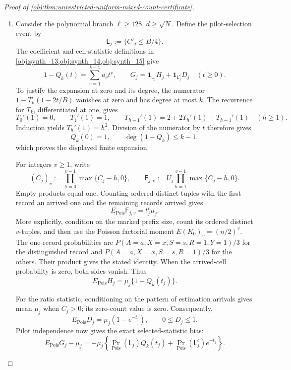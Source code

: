 \documentclass[11pt]{article}
\begin{document}
\begin{proof}[Proof of \cref{obj:thm:unrestricted-uniform-mixed-count-certificate}]
\begin{enumerate}
\item Consider the polynomial branch
\(\ell\ge128\), \(d\ge\sqrt N\). Define the pilot-selection event by
\[
\mathsf L_j:=\{C'_j\le B/4\}.
\]
The coefficient and cell-statistic definitions in
\cref{obj:synth_13,obj:synth_14,obj:synth_15} give
\[
1-Q_k(t)=\sum_{v=1}^{k-1}a_vt^v,
\qquad
G_j=\mathbf1_{\mathsf L_j}H_j+
\mathbf1_{\mathsf L_j^c}D_j
\quad(t\ge0).
\]
To justify the expansion at zero and its degree, the numerator
\(1-T_k(1-2t/B)\) vanishes at zero and has degree at most \(k\).
The recurrence for \(T_k\), differentiated at one, gives
\[
T_0'(1)=0,\qquad T_1'(1)=1,\qquad
T_{h+1}'(1)=2+2T_h'(1)-T_{h-1}'(1)
\quad(h\ge1).
\]
Induction yields \(T_h'(1)=h^2\). Division of the numerator by \(t\)
therefore gives
\[
Q_k(0)=1,\qquad \deg(1-Q_k)\le k-1,
\]
which proves the displayed finite expansion.

For integers \(v\ge1\), write
\[
(C_j)_v:=\prod_{h=0}^{v-1}\max\{C_j-h,0\},
\qquad
\mathsf F_{j,v}:=
U_j\prod_{h=1}^{v-1}\max\{C_j-h,0\}.
\]
Empty products equal one. Counting ordered distinct tuples with the first
record an arrived one and the remaining records arrived gives
\[
E_{\mathrm{Pois}}\mathsf F_{j,v}
=t_j^v\mu_j.
\]
More explicitly, condition on the marked prefix size, count its ordered
distinct \(v\)-tuples, and then use the Poisson factorial moment
\(E(K_0)_v=(n/2)^v\). The one-record probabilities are
\(P(A=a,X=x,S=s,R=1,Y=1)/3\) for the distinguished record and
\(P(A=a,X=x,S=s,R=1)/3\) for the others. Their product gives the stated
identity. When the arrived-cell probability is zero, both sides vanish.
Thus
\[
E_{\mathrm{Pois}}H_j
=\mu_j\{1-Q_k(t_j)\}.
\]

For the ratio statistic, conditioning on the pattern of estimation
arrivals gives mean \(\mu_j\) when \(C_j>0\); its zero-count value is zero.
Consequently,
\[
E_{\mathrm{Pois}}D_j=\mu_j(1-e^{-t_j}),
\qquad 0\le D_j\le1.
\]
Pilot independence now gives the exact selected-statistic bias:
\[
E_{\mathrm{Pois}}G_j-\mu_j
=-\mu_j\left\{
\Pr_{\mathrm{Pois}}(\mathsf L_j)Q_k(t_j)
+\Pr_{\mathrm{Pois}}(\mathsf L_j^c)e^{-t_j}
\right\}.
\]


\end{enumerate}
\end{proof}
\end{document}
